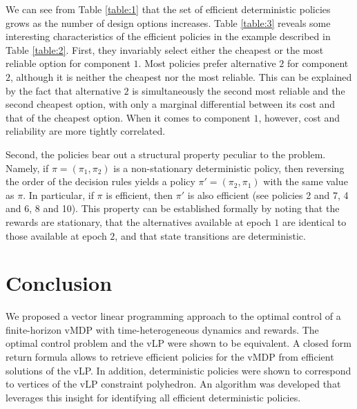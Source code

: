 \documentclass{article}
\theoremstyle{definition}
\numberwithin{equation}{section}
\begin{document}
We can see from Table \ref{table:1} that the set of efficient deterministic policies grows as the number of design options increases. Table \ref{table:3} reveals some interesting characteristics of the efficient policies in the example described in Table \ref{table:2}. First, they invariably select either the cheapest or the most reliable option for component $1$. Most policies prefer alternative $2$ for component $2$, although it is neither the cheapest nor the most reliable. This can be explained by the fact that alternative $2$ is simultaneously the second most reliable and the second cheapest option, with only a marginal differential between its cost and that of the cheapest option.
When it comes to component $1$, however, cost and reliability are more tightly correlated.

Second, the policies bear out a structural property peculiar to the %
problem. Namely, if $\pi = (\pi_1, \pi_2)$ is a non-stationary deterministic policy, then reversing the order of the decision rules yields a policy $\pi' = (\pi_2, \pi_1)$ with the same value as $\pi$. In particular, if $\pi$ is efficient, then $\pi'$ is also efficient (see policies 2 and 7, 4 and 6, 8 and 10). This property can be established formally by noting that the rewards are stationary, that the alternatives available at epoch $1$ are identical to those available at epoch $2$, and that state transitions are deterministic.
\\


\section{Conclusion}
\label{sect_conclusion}
We proposed a vector linear programming approach to the optimal control of a finite-horizon vMDP with time-heterogeneous dynamics and rewards. The optimal control problem and the vLP were shown to be equivalent. A closed form return formula allows to retrieve efficient
policies for the vMDP from efficient solutions of the vLP. 
In addition, deterministic policies were shown to correspond to vertices of the vLP constraint polyhedron. An algorithm was developed that leverages this insight for identifying all efficient deterministic policies.
\end{document}
